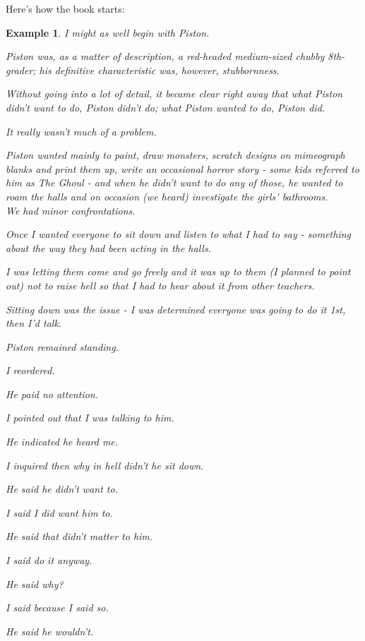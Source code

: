 \documentclass{book}
\numberwithin{equation}{section}
\newtheorem{example}{Example}[chapter]
\begin{document}
Here's how the book starts:
\begin{example}
    I might as well begin with Piston.
    
    Piston was, as a matter of description, a red-headed medium-sized chubby 8th-grader; his definitive characteristic was, however, stubbornness.
    
    Without going into a lot of detail, it became clear right away that what Piston didn't want to do, Piston didn't do; what Piston wanted to do, Piston did.
    
    It really wasn't much of a problem.
    
    Piston wanted mainly to paint, draw monsters, scratch designs on mimeograph blanks and print them up, write an occasional horror story - some kids referred to him as The Ghoul - and when he didn't want to do any of those, he wanted to roam the halls and on occasion (we heard) investigate the girls' bathrooms.
    \\
    
    We had minor confrontations.
    
    Once I wanted everyone to sit down and listen to what I had to say - something about the way they had been acting in the halls.
    
    I was letting them come and go freely and it was up to them (I planned to point out) not to raise hell so that I had to hear about it from other teachers.
    
    Sitting down was the issue - I was determined everyone was going to do it 1st, then I'd talk.
    
    Piston remained standing.
    
    I reordered.
    
    He paid no attention.
    
    I pointed out that I was talking to him.
    
    He indicated he heard me.
    
    I inquired then why in hell didn't he sit down.
    
    He said he didn't want to.
    
    I said I did want him to.
    
    He said that didn't matter to him.
    
    I said do it anyway.
    
    He said why?
    
    I said because I said so.
    
    He said he wouldn't.
    

\end{example}
\end{document}
